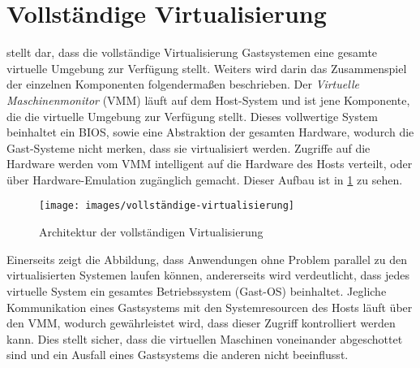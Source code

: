 \section{Vollständige Virtualisierung}
\label{sec:vollständige-virtualisierung}
\autocite{Baun2009} stellt dar, dass die vollständige Virtualisierung Gastsystemen eine gesamte virtuelle Umgebung zur Verfügung stellt.
Weiters wird darin das Zusammenspiel der einzelnen Komponenten folgendermaßen beschrieben.
Der \emph{Virtuelle Maschinenmonitor} (VMM) läuft auf dem Host-System und ist jene Komponente, die die virtuelle Umgebung zur Verfügung stellt.
Dieses vollwertige System beinhaltet ein BIOS, sowie eine Abstraktion der gesamten Hardware, wodurch die Gast-Systeme nicht merken, dass sie virtualisiert werden.
Zugriffe auf die Hardware werden vom VMM intelligent auf die Hardware des Hosts verteilt, oder über Hardware-Emulation zugänglich gemacht.
Dieser Aufbau ist in \cref{fig:architektur-vollständige-virtualisierung} zu sehen.
\begin{figure}[htbp]
    \centering
    \texttt{[image: images/vollständige-virtualisierung]}
    \caption{Architektur der vollständigen Virtualisierung}
\label{fig:architektur-vollständige-virtualisierung}
\end{figure}
Einerseits zeigt die Abbildung, dass Anwendungen ohne Problem parallel zu den virtualisierten Systemen laufen können, andererseits wird verdeutlicht, dass jedes virtuelle System ein gesamtes Betriebssystem (Gast-OS) beinhaltet.
Jegliche Kommunikation eines Gastsystems mit den Systemresourcen des Hosts läuft über den VMM, wodurch gewährleistet wird, dass dieser Zugriff kontrolliert werden kann.
Dies stellt sicher, dass die virtuellen Maschinen voneinander abgeschottet sind und ein Ausfall eines Gastsystems die anderen nicht beeinflusst.

